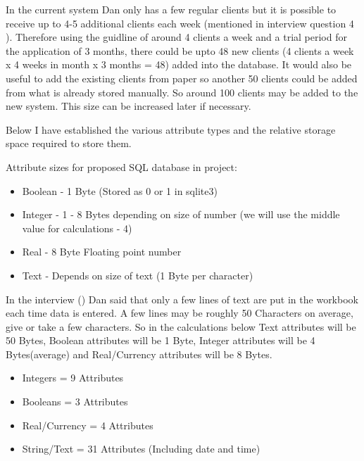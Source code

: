 \begin{flushleft}

	In the current system Dan only has a few regular clients but it is possible to receive up to 4-5 additional clients each week (mentioned in interview question 4 \pageref{fig:interview}). Therefore using the guidline of around 4 clients a week and a trial period for the application of 3 months, there could be upto 48 new clients (4 clients a week x 4 weeks in month x 3 months = 48) added into the database. It would also be useful to add the existing clients from paper so another 50 clients could be added from what is already stored manually. So around 100 clients may be added to the new system. This size can be increased later if necessary. \par

Below I have established the various attribute types and the relative storage space required to store them.

Attribute sizes for proposed SQL database in project:
\begin{itemize}
    \item 	Boolean - 1 Byte (Stored as 0 or 1 in sqlite3)
	 \item Integer - 1 - 8 Bytes depending on size of number (we will use the middle value for calculations - 4)
	\item Real - 8 Byte Floating point number
	\item Text - Depends on size of text (1 Byte per character)
\end{itemize}

\begin{flushleft}
In the interview (\pageref{fig:interview}) Dan said that only a few lines of text are put in the workbook each time data is entered. A few lines may be roughly 50 Characters on average, give or take a few characters. So in the calculations below Text attributes will be 50 Bytes, Boolean attributes will be 1 Byte, Integer attributes will be 4 Bytes(average) and Real/Currency attributes will be 8 Bytes.
\end{flushleft}

\begin{itemize}
    \item Integers = 9 Attributes
	\item Booleans = 3 Attributes
	\item Real/Currency = 4 Attributes
	\item String/Text = 31 Attributes (Including date and time)
\end{itemize}


\end{flushleft}
